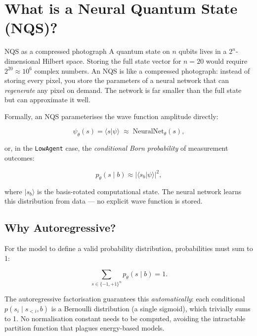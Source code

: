 \documentclass[11pt, a4paper]{article}
\begin{document}
\section{What is a Neural Quantum State (NQS)?}

\begin{analogybox}{NQS as a compressed photograph}
A quantum state on $n$ qubits lives in a $2^n$-dimensional Hilbert space.
Storing the full state vector for $n=20$ would require $2^{20} \approx 10^6$
complex numbers. An NQS is like a compressed photograph: instead of storing
every pixel, you store the parameters of a neural network that can
\emph{regenerate} any pixel on demand. The network is far smaller than the
full state but can approximate it well.
\end{analogybox}

Formally, an NQS parameterises the wave function amplitude directly:

\begin{equation}
  \psi_\theta(s) = \langle s | \psi \rangle
  \;\approx\;
  \mathrm{NeuralNet}_\theta(s),
\end{equation}

or, in the \texttt{LowAgent} case, the \emph{conditional Born probability}
of measurement outcomes:

\begin{equation}
  p_\theta(s \mid b) \approx |\langle s_b | \psi \rangle|^2,
\end{equation}

where $|s_b\rangle$ is the basis-rotated computational state. The neural
network learns this distribution from data — no explicit wave function is
stored.

\subsection{Why Autoregressive?}

For the model to define a valid probability distribution, probabilities must
sum to 1:

\begin{equation}
  \sum_{s \in \{-1,+1\}^n} p_\theta(s \mid b) = 1.
\end{equation}

The autoregressive factorisation guarantees this \emph{automatically}:
each conditional $p(s_i \mid s_{<i}, b)$ is a Bernoulli distribution
(a single sigmoid), which trivially sums to 1. No normalisation constant
needs to be computed, avoiding the intractable partition function that plagues
energy-based models.
\end{document}
